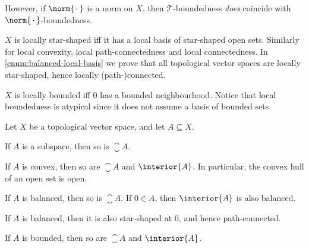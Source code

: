 \documentclass[article, a4paper, 11pt, oneside]{memoir}
\numberwithin{equation}{chapter}
\newcommand{\calT}{\mathcal{T}}
\begin{document}
\begin{remark}
\begin{enumrem}
        However, if $\norm{\,\cdot\,}$ is a norm on $X$, then $\calT$-boundedness \emph{does} coincide with $\norm{\,\cdot\,}$-boundedness.
        
        \item $X$ is locally star-shaped iff it has a local basis of star-shaped open sets. Similarly for local convexity, local path-connectedness and local connectedness. In \cref{enum:balanced-local-basis} we prove that all topological vector spaces are locally star-shaped, hence locally (path-)connected.

        \item $X$ is locally bounded iff $0$ has a bounded neighbourhood. Notice that local boundedness is atypical since it does not assume a basis of bounded sets.
    \end{enumrem}
\end{remark}


\begin{lemma}
    Let $X$ be a topological vector space, and let $A \subseteq X$.
    \begin{enumlem}
        \item If $A$ is a subspace, then so is $\closure{A}$.
        
        \item \label{enum:convex-closure-interior} If $A$ is convex, then so are $\closure{A}$ and $\interior{A}$. In particular, the convex hull of an open set is open.
        
        \item If $A$ is balanced, then so is $\closure{A}$. If $0 \in A$, then $\interior{A}$ is also balanced.

        \item \label{enum:balanced-implies-connected} If $A$ is balanced, then it is also star-shaped at $0$, and hence path-connected.
        
        \item If $A$ is bounded, then so are $\closure{A}$ and $\interior{A}$.
    \end{enumlem}
\end{lemma}
\end{document}
